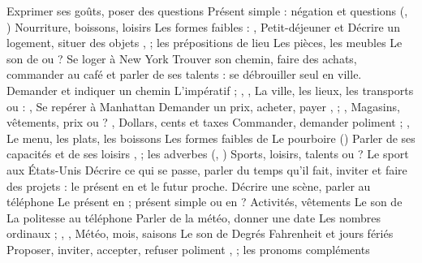   {Exprimer ses goûts, poser des questions}
  {Présent simple : négation et questions (, )}
  {Nourriture, boissons, loisirs}
  {Les formes faibles : , }
  {Petit-déjeuner et }
  {Décrire un logement, situer des objets}
  {,  ; les prépositions de lieu}
  {Les pièces, les meubles}
  {Le son  de }
  { ou  ? Se loger à New York}
  {Trouver son chemin, faire des achats, commander au café et parler de ses talents :
   se débrouiller seul en ville.}
  {Demander et indiquer un chemin}
  {L'impératif ; , , }
  {La ville, les lieux, les transports}
  { ou  : , }
  {Se repérer à Manhattan}
  {Demander un prix, acheter, payer}
  {,  ; , }
  {Magasins, vêtements, prix}
  { ou  ? , }
  {Dollars, cents et taxes}
  {Commander, demander poliment}
  { ; , }
  {Le menu, les plats, les boissons}
  {Les formes faibles de }
  {Le pourboire ()}
  {Parler de ses capacités et de ses loisirs}
  {,  ; les adverbes (, )}
  {Sports, loisirs, talents}
  {  ou   ?}
  {Le sport aux États-Unis}
  {Décrire ce qui se passe, parler du temps qu'il fait, inviter et faire des projets :
   le présent en  et le futur proche.}
  {Décrire une scène, parler au téléphone}
  {Le présent en  ; présent simple ou en  ?}
  {Activités, vêtements}
  {Le son  de }
  {La politesse au téléphone}
  {Parler de la météo, donner une date}
  {Les nombres ordinaux ; , , }
  {Météo, mois, saisons}
  {Le son  de }
  {Degrés Fahrenheit et jours fériés}
  {Proposer, inviter, accepter, refuser poliment}
  {,  ; les pronoms compléments}

